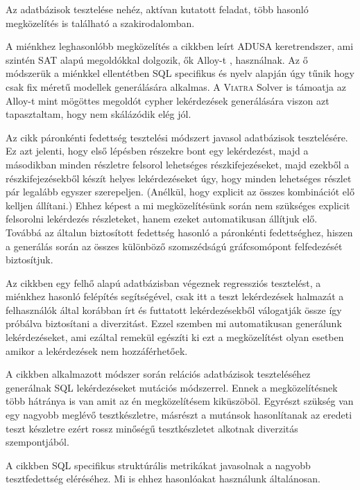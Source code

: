 Az adatbázisok tesztelése nehéz, aktívan kutatott feladat, több hasonló megközelítés is található a szakirodalomban.


A miénkhez leghasonlóbb megközelítés a \cite{DBLP:conf} cikkben leírt ADUSA keretrendszer, ami szintén SAT alapú megoldókkal dolgozik, ők Alloy-t \cite{Alloy:Language} , \cite{alloy:kodkod} használnak. Az ő módszerük a miénkkel ellentétben SQL specifikus és nyelv alapján úgy tűnik hogy csak fix méretű modellek generálására alkalmas. A \textsc{Viatra} Solver is támoatja az Alloy-t mint mögöttes megoldót cypher lekérdezések generálására viszon azt tapasztaltam, hogy nem skálázódik elég jól.


Az \cite{myint2018test} cikk páronkénti fedettség tesztelési módszert javasol adatbázisok tesztelésére. Ez azt jelenti, hogy első lépésben részekre bont egy lekérdezést, majd a másodikban minden részletre felsorol lehetséges részkifejezéseket, majd ezekből a részkifejezésekből készít helyes lekérdezéseket úgy, hogy minden lehetséges részlet pár legalább egyszer szerepeljen. (Anélkül, hogy explicit az összes kombinációt elő kelljen állítani.) Ehhez képest a mi megközelítésünk során nem szükséges explicit felsorolni lekérdezés részleteket, hanem ezeket automatikusan állítjuk elő. Továbbá az általun biztosított fedettség hasonló a  páronkénti fedettséghez, hiszen a generálás során az összes különböző szomszédságú gráfcsomópont felfedezését biztosítjuk.
	 
 Az \cite{yan2018snowtrail} cikkben egy felhő alapú adatbázisban végeznek regressziós tesztelést, a miénkhez hasonló felépítés segítségével, csak itt a teszt lekérdezések halmazát a felhasználók által korábban írt és futtatott lekérdezésekből válogatják össze így próbálva biztosítani a diverzitást. Ezzel szemben mi automatikusan generálunk lekérdezéseket, ami ezáltal remekül egészíti ki ezt a megközelítést olyan esetben amikor a lekérdezések nem hozzáférhetőek. 

A \cite{tuya2006sqlmutation} cikkben alkalmazott módszer során relációs adatbázisok teszteléséhez generálnak SQL lekérdezéseket mutációs módszerrel. Ennek a megközelítésnek több hátránya is van amit az én megközelítésem kiküszöböl. Egyrészt szükség van egy nagyobb meglévő tesztkészletre, másrészt a mutánsok hasonlítanak az eredeti teszt készletre ezért rossz minőségű tesztkészletet alkotnak diverzitás szempontjából. 

A \cite{SuarezCabal} cikkben SQL specifikus struktúrális metrikákat javasolnak a nagyobb tesztfedettség eléréséhez. Mi is ehhez hasonlóakat használunk általánosan.

